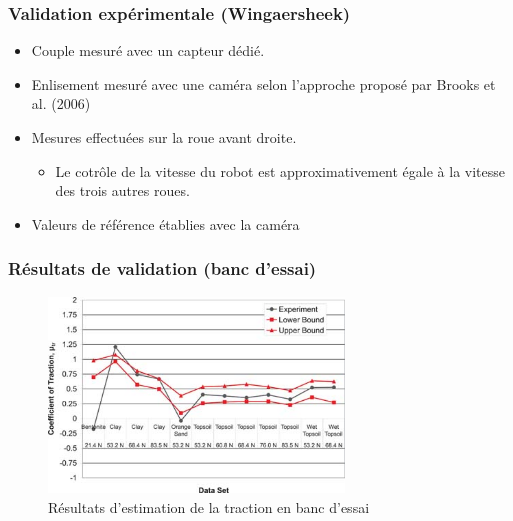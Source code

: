     \begin{frame}
        \frametitle{Validation expérimentale (Wingaersheek)}
        \begin{itemize}
            \item Couple mesuré avec un capteur dédié.
            \item Enlisement mesuré avec une caméra selon l'approche proposé par Brooks et al. (2006)
            \item Mesures effectuées sur la roue avant droite.
            \begin{itemize}
                \item Le cotrôle de la vitesse du robot est approximativement égale à la vitesse des trois autres roues. 
            \end{itemize}
            \item Valeurs de référence établies avec la caméra
        \end{itemize}
    \end{frame}    
    
    \begin{frame}
        \frametitle{Résultats de validation (banc d'essai)}
        \begin{figure}
            \includegraphics[width=0.7\textwidth]{./media/tractionResults.jpg}
            \captionsetup{justification=centering}
            \caption{Résultats d'estimation de la traction en banc d'essai}
        \end{figure}         
    \end{frame} 
    
